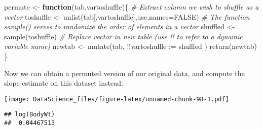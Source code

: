 \documentclass[
]{book}
\newenvironment{Shaded}{\begin{snugshade}}{\end{snugshade}}
\newcommand{\AttributeTok}[1]{\textcolor[rgb]{0.77,0.63,0.00}{#1}}
\newcommand{\CommentTok}[1]{\textcolor[rgb]{0.56,0.35,0.01}{\textit{#1}}}
\newcommand{\ConstantTok}[1]{\textcolor[rgb]{0.00,0.00,0.00}{#1}}
\newcommand{\ControlFlowTok}[1]{\textcolor[rgb]{0.13,0.29,0.53}{\textbf{#1}}}
\newcommand{\DecValTok}[1]{\textcolor[rgb]{0.00,0.00,0.81}{#1}}
\newcommand{\FunctionTok}[1]{\textcolor[rgb]{0.00,0.00,0.00}{#1}}
\newcommand{\NormalTok}[1]{#1}
\newcommand{\OtherTok}[1]{\textcolor[rgb]{0.56,0.35,0.01}{#1}}
\newcommand{\SpecialCharTok}[1]{\textcolor[rgb]{0.00,0.00,0.00}{#1}}
\newcommand{\StringTok}[1]{\textcolor[rgb]{0.31,0.60,0.02}{#1}}
\begin{document}
\begin{Shaded}
\begin{Highlighting}[]
\NormalTok{permute }\OtherTok{\textless{}{-}} \ControlFlowTok{function}\NormalTok{(tab,vartoshuffle)\{}
  \CommentTok{\# Extract column we wish to shuffle as a vector}
\NormalTok{  toshuffle }\OtherTok{\textless{}{-}} \FunctionTok{unlist}\NormalTok{(tab[,vartoshuffle],}\AttributeTok{use.names=}\ConstantTok{FALSE}\NormalTok{)}
  \CommentTok{\# The function sample() serves to randomize the order of elements in a vector}
\NormalTok{  shuffled }\OtherTok{\textless{}{-}} \FunctionTok{sample}\NormalTok{(toshuffle)}
  \CommentTok{\# Replace vector in new table (use !! to refer to a dynamic variable name)}
\NormalTok{  newtab }\OtherTok{\textless{}{-}} \FunctionTok{mutate}\NormalTok{(tab, }\SpecialCharTok{!!}\AttributeTok{vartoshuffle :=}\NormalTok{ shuffled )}
  \FunctionTok{return}\NormalTok{(newtab)}
\NormalTok{\}}
\end{Highlighting}
\end{Shaded}

Now we can obtain a permuted version of our original data, and compute the slope estimate on this dataset instead:

\begin{Shaded}
\end{Shaded}

\texttt{[image: DataScience\_files/figure-latex/unnamed-chunk-98-1.pdf]}

\begin{Shaded}
\end{Shaded}

\begin{verbatim}
## log(BodyWt) 
##  0.04467513
\end{verbatim}
\end{document}
